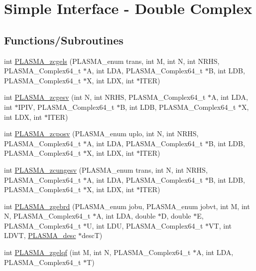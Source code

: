\hypertarget{group__PLASMA__Complex64__t}{
\section{Simple Interface -\/ Double Complex}
\label{group__PLASMA__Complex64__t}
}
\subsection*{Functions/Subroutines}
\begin{DoxyCompactItemize}
\item 
int \hyperlink{group__PLASMA__Complex64__t_ga6733ad2b79f186348ba47778e2e26fae_ga6733ad2b79f186348ba47778e2e26fae}{PLASMA\_\-zcgels} (PLASMA\_\-enum trans, int M, int N, int NRHS, PLASMA\_\-Complex64\_\-t $\ast$A, int LDA, PLASMA\_\-Complex64\_\-t $\ast$B, int LDB, PLASMA\_\-Complex64\_\-t $\ast$X, int LDX, int $\ast$ITER)
\item 
int \hyperlink{group__PLASMA__Complex64__t_gab372ccb64517ddb8e0f7ea66088489a9_gab372ccb64517ddb8e0f7ea66088489a9}{PLASMA\_\-zcgesv} (int N, int NRHS, PLASMA\_\-Complex64\_\-t $\ast$A, int LDA, int $\ast$IPIV, PLASMA\_\-Complex64\_\-t $\ast$B, int LDB, PLASMA\_\-Complex64\_\-t $\ast$X, int LDX, int $\ast$ITER)
\item 
int \hyperlink{group__PLASMA__Complex64__t_ga11ee4c71901e8675d5423cfceecaaf43_ga11ee4c71901e8675d5423cfceecaaf43}{PLASMA\_\-zcposv} (PLASMA\_\-enum uplo, int N, int NRHS, PLASMA\_\-Complex64\_\-t $\ast$A, int LDA, PLASMA\_\-Complex64\_\-t $\ast$B, int LDB, PLASMA\_\-Complex64\_\-t $\ast$X, int LDX, int $\ast$ITER)
\item 
int \hyperlink{group__PLASMA__Complex64__t_gaba15b4f438d8d2fe41f2c38820d043ef_gaba15b4f438d8d2fe41f2c38820d043ef}{PLASMA\_\-zcungesv} (PLASMA\_\-enum trans, int N, int NRHS, PLASMA\_\-Complex64\_\-t $\ast$A, int LDA, PLASMA\_\-Complex64\_\-t $\ast$B, int LDB, PLASMA\_\-Complex64\_\-t $\ast$X, int LDX, int $\ast$ITER)
\item 
int \hyperlink{group__PLASMA__Complex64__t_gaeaf62e9c3d1a1259c0dbeb91e5eb6693_gaeaf62e9c3d1a1259c0dbeb91e5eb6693}{PLASMA\_\-zgebrd} (PLASMA\_\-enum jobu, PLASMA\_\-enum jobvt, int M, int N, PLASMA\_\-Complex64\_\-t $\ast$A, int LDA, double $\ast$D, double $\ast$E, PLASMA\_\-Complex64\_\-t $\ast$U, int LDU, PLASMA\_\-Complex64\_\-t $\ast$VT, int LDVT, \hyperlink{typeplasma__desc__t}{PLASMA\_\-desc} $\ast$descT)
\item 
int \hyperlink{group__PLASMA__Complex64__t_ga848678454b9e0462625fd9fd77568edf_ga848678454b9e0462625fd9fd77568edf}{PLASMA\_\-zgelqf} (int M, int N, PLASMA\_\-Complex64\_\-t $\ast$A, int LDA, PLASMA\_\-Complex64\_\-t $\ast$T)

\end{DoxyCompactItemize}

